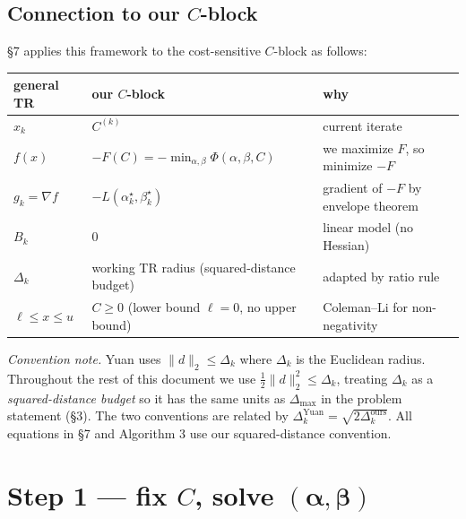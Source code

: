 \documentclass[11pt,a4paper]{article}
\begin{document}
\subsection{Connection to our $C$-block}

\S 7 applies this framework to the cost-sensitive $C$-block as follows:
\begin{center}
\begin{tabular}{lll}
\toprule
\textbf{general TR} & \textbf{our $C$-block} & \textbf{why} \\
\midrule
$x_k$ & $C^{(k)}$ & current iterate \\
$f(x)$ & $-F(C) = -\min_{\alpha,\beta}\Phi(\alpha,\beta,C)$ & we maximize $F$, so minimize $-F$ \\
$g_k = \nabla f$ & $-L(\alpha_k^\star,\beta_k^\star)$ & gradient of $-F$ by envelope theorem \\
$B_k$ & $0$ & linear model (no Hessian) \\
$\Delta_k$ & working TR radius (squared-distance budget) & adapted by ratio rule \\
$\ell \le x \le u$ & $C \ge 0$ (lower bound $\ell = 0$, no upper bound) & Coleman--Li for non-negativity \\
\bottomrule
\end{tabular}
\end{center}

\noindent\emph{Convention note.} Yuan uses $\|d\|_2 \le \Delta_k$ where $\Delta_k$ is the Euclidean radius. Throughout the rest of this document we use $\tfrac12\|d\|_2^2 \le \Delta_k$, treating $\Delta_k$ as a \emph{squared-distance budget} so it has the same units as $\Delta_{\max}$ in the problem statement (\S 3). The two conventions are related by $\Delta_k^{\mathrm{Yuan}} = \sqrt{2\Delta_k^{\mathrm{ours}}}$. All equations in \S 7 and Algorithm 3 use our squared-distance convention.

\section{Step 1 --- fix $C$, solve $(\boldsymbol{\alpha}, \boldsymbol{\beta})$}
\end{document}
